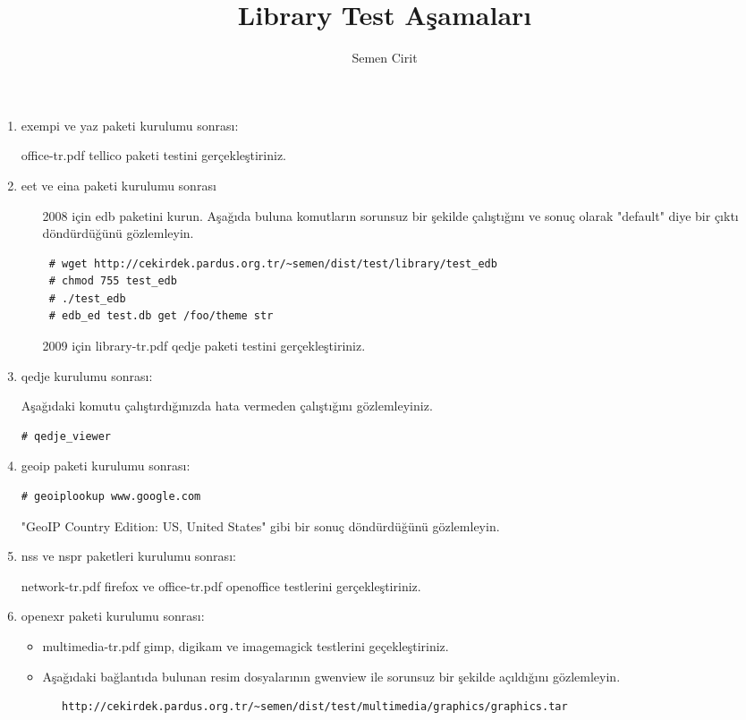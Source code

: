 \documentclass[a4paper,10pt]{article}
\title{Library Test Aşamaları}
\author{Semen Cirit}
\begin{document}
\maketitle
\begin{enumerate}
\item exempi ve yaz paketi kurulumu sonrası:

office-tr.pdf tellico paketi testini gerçekleştiriniz.

\item eet ve eina paketi kurulumu sonrası
\begin{itemize}
 \item [2008 için] edb paketini kurun. Aşağıda buluna komutların sorunsuz bir şekilde çalıştığını ve sonuç olarak "default" diye bir çıktı döndürdüğünü gözlemleyin.
\begin{verbatim}
 # wget http://cekirdek.pardus.org.tr/~semen/dist/test/library/test_edb
 # chmod 755 test_edb
 # ./test_edb
 # edb_ed test.db get /foo/theme str
\end{verbatim}
\item [2009 için] library-tr.pdf qedje paketi testini gerçekleştiriniz.
\end{itemize}

\item qedje kurulumu sonrası:

Aşağıdaki komutu çalıştırdığınızda hata vermeden çalıştığını gözlemleyiniz.
\begin{verbatim}
# qedje_viewer
\end{verbatim}

\item geoip paketi kurulumu sonrası:
\begin{verbatim}
# geoiplookup www.google.com 
\end{verbatim}
"GeoIP Country Edition: US, United States" gibi bir sonuç döndürdüğünü gözlemleyin.

\item nss ve nspr paketleri kurulumu sonrası:

network-tr.pdf firefox ve office-tr.pdf openoffice testlerini gerçekleştiriniz.

\item openexr paketi kurulumu sonrası:
\begin{itemize}
 \item multimedia-tr.pdf gimp, digikam ve imagemagick testlerini geçekleştiriniz.
 \item Aşağıdaki bağlantıda bulunan resim dosyalarının gwenview ile sorunsuz bir şekilde açıldığını gözlemleyin.
  \begin{verbatim}
   http://cekirdek.pardus.org.tr/~semen/dist/test/multimedia/graphics/graphics.tar
  \end{verbatim}
\end{itemize}

\end{enumerate}
\end{document}
